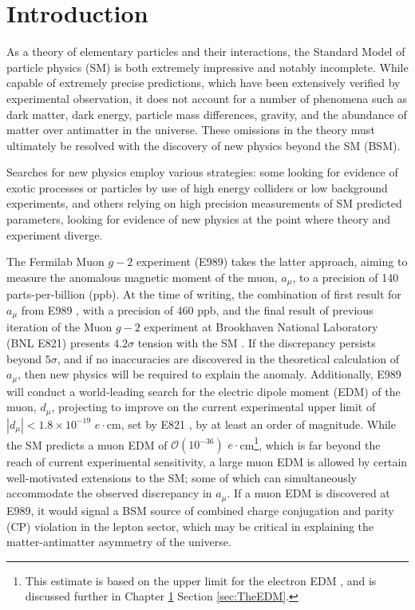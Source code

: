 \chapter{Introduction}\label{chap:1}

As a theory of elementary particles and their interactions, the Standard Model of particle physics (SM) is both extremely impressive and notably incomplete. While capable of extremely precise predictions, which have been extensively verified by experimental observation, it does not account for a number of phenomena such as dark matter, dark energy, particle mass differences, gravity, and the abundance of matter over antimatter in the universe. These omissions in the theory must ultimately be resolved with the discovery of new physics beyond the SM (BSM). 

Searches for new physics employ various strategies: some looking for evidence of exotic processes or particles by use of high energy colliders or low background experiments, and others relying on high precision measurements of SM predicted parameters, looking for evidence of new physics at the point where theory and experiment diverge.

The Fermilab Muon $g-2$ experiment (E989) takes the latter approach, aiming to measure the anomalous magnetic moment of the muon, $a_{\mu}$, to a precision of 140 parts-per-billion (ppb). At the time of writing, the combination of first result for $a_{\mu}$ from E989 \cite{SummaryRun1}, with a precision of 460 ppb, and the final result of previous iteration of the Muon $g-2$ experiment at Brookhaven National Laboratory (BNL E821) \cite{BNLFinalReport} presents $4.2\sigma$ tension with the SM \cite{aMuSM}. If the discrepancy persists beyond $5\sigma$, and if no inaccuracies are discovered in the theoretical calculation of $a_{\mu}$, then new physics will be required to explain the anomaly. Additionally, E989 will conduct a world-leading search for the electric dipole moment (EDM) of the muon, $d_{\mu}$, projecting to improve on the current experimental upper limit of $|d_{\mu}|<1.8\times10^{-19}$ $e\cdot$cm, set by E821 \cite{BNLEDM}, by at least an order of magnitude. While the SM predicts a muon EDM of $\mathcal{O}(10^{-36})$ $e\cdot$cm\footnote{This estimate is based on the upper limit for the electron EDM \cite{ImprovedElectronEDMLimit}, and is discussed further in Chapter \ref{chap:1} Section \ref{sec:TheEDM}.}, which is far beyond the reach of current experimental sensitivity, a large muon EDM is allowed by certain well-motivated extensions to the SM; some of which can simultaneously accommodate the observed discrepancy in $a_{\mu}$. If a muon EDM is discovered at E989, it would signal a BSM source of combined charge conjugation and parity (CP) violation in the lepton sector, which may be critical in explaining the matter-antimatter asymmetry of the universe.

